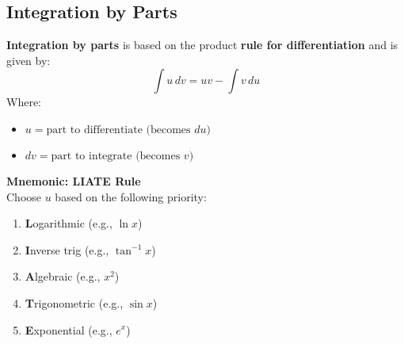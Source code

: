 \documentclass[11pt]{article}
\begin{document}
\subsection{Integration by Parts}
\textbf{Integration by parts} is based on the product \textbf{rule for differentiation} and is given by:
\[
  \boxed{
    \int u \, dv = uv - \int v \, du
  }
\]
Where:
\begin{itemize}
    \item $u = \text{part to differentiate (becomes } du)$
    \item $dv = \text{part to integrate (becomes } v)$
\end{itemize}\textbf{Mnemonic: LIATE Rule}\\
\noindent Choose $u$ based on the following priority:
\begin{enumerate}
    \item \textbf{L}ogarithmic (e.g., $\ln x$)
    \item \textbf{I}nverse trig (e.g., $\tan^{-1} x$)
    \item \textbf{A}lgebraic (e.g., $x^2$)
    \item \textbf{T}rigonometric (e.g., $\sin x$)
    \item \textbf{E}xponential (e.g., $e^x$)
\end{enumerate}
\end{document}
